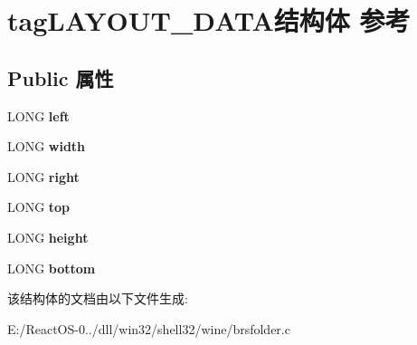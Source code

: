 \hypertarget{structtag_l_a_y_o_u_t___d_a_t_a}{}\section{tag\+L\+A\+Y\+O\+U\+T\+\_\+\+D\+A\+T\+A结构体 参考}
\label{structtag_l_a_y_o_u_t___d_a_t_a}
\subsection*{Public 属性}
\begin{DoxyCompactItemize}
\item 
\mbox{\label{structtag_l_a_y_o_u_t___d_a_t_a_af3ddab61f7cad8a29f59e05672294be3}} 
L\+O\+NG {\bfseries left}
\item 
\mbox{\label{structtag_l_a_y_o_u_t___d_a_t_a_add3f1ad9a858ea5724b2b6e8ca5f70e5}} 
L\+O\+NG {\bfseries width}
\item 
\mbox{\label{structtag_l_a_y_o_u_t___d_a_t_a_aeb8e9662afa483d0c13a273c4946561d}} 
L\+O\+NG {\bfseries right}
\item 
\mbox{\label{structtag_l_a_y_o_u_t___d_a_t_a_abf33334868e65a60c0c5c66ce953f45e}} 
L\+O\+NG {\bfseries top}
\item 
\mbox{\label{structtag_l_a_y_o_u_t___d_a_t_a_a18dfb9147932de6a8b8e37b67494fb42}} 
L\+O\+NG {\bfseries height}
\item 
\mbox{\label{structtag_l_a_y_o_u_t___d_a_t_a_a9e4d0c5ec8df876e1a04d3159b3c6986}} 
L\+O\+NG {\bfseries bottom}
\end{DoxyCompactItemize}


该结构体的文档由以下文件生成\+:\begin{DoxyCompactItemize}
\item 
E\+:/\+React\+O\+S-\/0../dll/win32/shell32/wine/brsfolder.\+c\end{DoxyCompactItemize}
